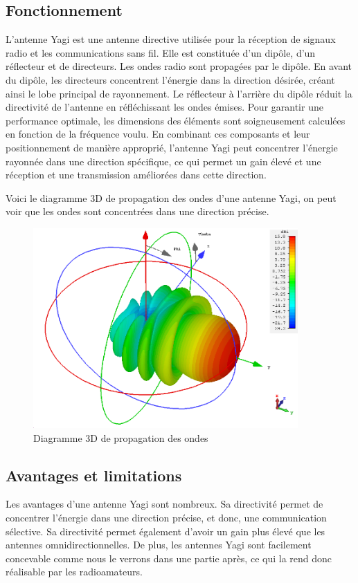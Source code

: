 \documentclass[12pt, a4paper]{article}
\begin{document}
\subsection{Fonctionnement}
L'antenne Yagi est une antenne directive 
utilisée pour la réception de signaux radio et les 
communications sans fil. Elle est constituée d'un 
dipôle, d'un réflecteur et de directeurs. Les ondes 
radio sont propagées par le dipôle. En avant du 
dipôle, les directeurs concentrent l'énergie dans la 
direction désirée, créant ainsi le lobe principal de 
rayonnement. Le réflecteur à l'arrière du dipôle réduit 
la directivité de l'antenne en réfléchissant les ondes 
émises. Pour garantir une performance optimale, les 
dimensions des éléments sont soigneusement calculées en 
fonction de la fréquence voulu. En combinant ces 
composants et leur positionnement de manière approprié, l'antenne 
Yagi peut concentrer l'énergie rayonnée dans une 
direction spécifique, ce qui permet un gain élevé et 
une réception et une transmission améliorées dans 
cette direction.

Voici le diagramme 3D de propagation des ondes 
d'une antenne Yagi, on peut voir que les ondes sont
concentrées dans une direction précise.\\

\begin{figure}[h]
    \centering
    \includegraphics[width=0.9\textwidth]{img/pattern.png}
    \caption{Diagramme 3D de propagation des ondes \cite{r4}}
    \label{fig:3d}
\end{figure}


\subsection{Avantages et limitations}
Les avantages d'une antenne Yagi sont nombreux. Sa directivité
permet de concentrer l'énergie dans une direction précise, 
et donc, une communication sélective. Sa directivité
permet également d'avoir un gain plus élevé que les
antennes omnidirectionnelles. De plus, les antennes 
Yagi sont facilement concevable comme nous le verrons 
dans une partie après, ce qui la rend donc réalisable
par les radioamateurs.\\
\end{document}
